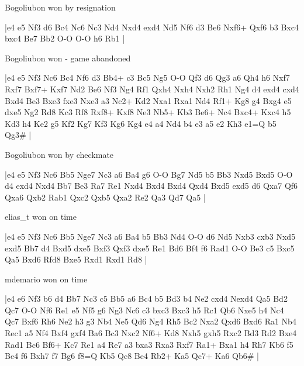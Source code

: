 \showboard

Bogoliubon won by resignation

\makegametitle
|e4 e5 Nf3 d6 Bc4 Nc6 Nc3 Nd4 Nxd4 exd4 Nd5 Nf6 d3 Be6 Nxf6+ Qxf6 b3 Bxc4 bxc4 Be7 Bb2 O-O O-O h6 Rb1  |

\showboard

Bogoliubon won - game abandoned

\makegametitle
|e4 e5 Nf3 Nc6 Bc4 Nf6 d3 Bb4+ c3 Bc5 Ng5 O-O Qf3 d6 Qg3 a6 Qh4 h6 Nxf7 Rxf7 Bxf7+ Kxf7 Nd2 Be6 Nf3 Ng4 Rf1 Qxh4 Nxh4 Nxh2 Rh1 Ng4 d4 exd4 cxd4 Bxd4 Be3 Bxe3 fxe3 Nxe3 a3 Nc2+ Kd2 Nxa1 Rxa1 Nd4 Rf1+ Kg8 g4 Bxg4 e5 dxe5 Ng2 Rd8 Kc3 Rf8 Rxf8+ Kxf8 Ne3 Nb5+ Kb3 Be6+ Nc4 Bxc4+ Kxc4 h5 Kd3 h4 Ke2 g5 Kf2 Kg7 Kf3 Kg6 Kg4 e4 a4 Nd4 b4 e3 a5 e2 Kh3 e1=Q b5 Qg3\#  |

\showboard

Bogoliubon won by checkmate

\makegametitle
|e4 e5 Nf3 Nc6 Bb5 Nge7 Nc3 a6 Ba4 g6 O-O Bg7 Nd5 b5 Bb3 Nxd5 Bxd5 O-O d4 exd4 Nxd4 Bb7 Be3 Ra7 Re1 Nxd4 Bxd4 Bxd4 Qxd4 Bxd5 exd5 d6 Qxa7 Qf6 Qxa6 Qxb2 Rab1 Qxc2 Qxb5 Qxa2 Re2 Qa3 Qd7 Qa5  |

\showboard

elias\_t won on time

\makegametitle
|e4 e5 Nf3 Nc6 Bb5 Nge7 Nc3 a6 Ba4 b5 Bb3 Nd4 O-O d6 Nd5 Nxb3 cxb3 Nxd5 exd5 Bb7 d4 Bxd5 dxe5 Bxf3 Qxf3 dxe5 Re1 Bd6 Bf4 f6 Rad1 O-O Be3 c5 Bxc5 Qa5 Bxd6 Rfd8 Bxe5 Rxd1 Rxd1 Rd8  |

\showboard

mdemario won on time

\makegametitle
|e4 e6 Nf3 b6 d4 Bb7 Nc3 c5 Bb5 a6 Bc4 b5 Bd3 b4 Ne2 cxd4 Nexd4 Qa5 Bd2 Qc7 O-O Nf6 Re1 e5 Nf5 g6 Ng3 Nc6 c3 bxc3 Bxc3 h5 Rc1 Qb6 Nxe5 h4 Nc4 Qc7 Bxf6 Rh6 Ne2 h3 g3 Nb4 Ne5 Qd6 Ng4 Rh5 Bc2 Nxa2 Qxd6 Bxd6 Ra1 Nb4 Rec1 a5 Nf4 Bxf4 gxf4 Ba6 Bc3 Nxc2 Nf6+ Kd8 Nxh5 gxh5 Rxc2 Bd3 Rd2 Bxe4 Rad1 Bc6 Bf6+ Kc7 Re1 a4 Re7 a3 bxa3 Rxa3 Rxf7 Ra1+ Bxa1 h4 Rh7 Kb6 f5 Be4 f6 Bxh7 f7 Bg6 f8=Q Kb5 Qc8 Be4 Rb2+ Ka5 Qc7+ Ka6 Qb6\#  |

\showboard

